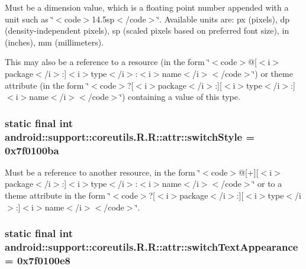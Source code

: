 Must be a dimension value, which is a floating point number appended with a unit such as \char`\"{}$<$code$>$14.5sp$<$/code$>$\char`\"{}. Available units are: px (pixels), dp (density-independent pixels), sp (scaled pixels based on preferred font size), in (inches), mm (millimeters). 

This may also be a reference to a resource (in the form \char`\"{}$<$code$>$@\mbox{[}$<$i$>$package$<$/i$>$:\mbox{]}$<$i$>$type$<$/i$>$:$<$i$>$name$<$/i$>$$<$/code$>$\char`\"{}) or theme attribute (in the form \char`\"{}$<$code$>$?\mbox{[}$<$i$>$package$<$/i$>$:\mbox{]}\mbox{[}$<$i$>$type$<$/i$>$:\mbox{]}$<$i$>$name$<$/i$>$$<$/code$>$\char`\"{}) containing a value of this type. \hypertarget{classandroid_1_1support_1_1coreutils_1_1_r_1_1attr_4a13474418706dbbf4eeffa69009540f}{
\subsubsection[{switchStyle}]{\setlength{\rightskip}{0pt plus 5cm}static final int android::support::coreutils.R.R::attr::switchStyle = 0x7f0100ba}}
\label{classandroid_1_1support_1_1coreutils_1_1_r_1_1attr_4a13474418706dbbf4eeffa69009540f}


Must be a reference to another resource, in the form \char`\"{}$<$code$>$@\mbox{[}+\mbox{]}\mbox{[}$<$i$>$package$<$/i$>$:\mbox{]}$<$i$>$type$<$/i$>$:$<$i$>$name$<$/i$>$$<$/code$>$\char`\"{} or to a theme attribute in the form \char`\"{}$<$code$>$?\mbox{[}$<$i$>$package$<$/i$>$:\mbox{]}\mbox{[}$<$i$>$type$<$/i$>$:\mbox{]}$<$i$>$name$<$/i$>$$<$/code$>$\char`\"{}. \hypertarget{classandroid_1_1support_1_1coreutils_1_1_r_1_1attr_25a584259c0a6d3f2b9a2ee7894f070e}{
\subsubsection[{switchTextAppearance}]{\setlength{\rightskip}{0pt plus 5cm}static final int android::support::coreutils.R.R::attr::switchTextAppearance = 0x7f0100e8}}
\label{classandroid_1_1support_1_1coreutils_1_1_r_1_1attr_25a584259c0a6d3f2b9a2ee7894f070e}


